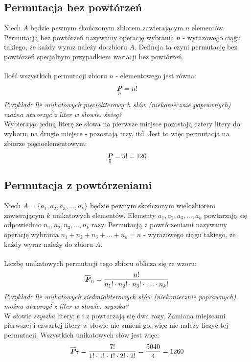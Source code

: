 \documentclass[14pt,a4paper]{extarticle}
\DeclareMathOperator{\varperm}{\textbf{\textit{P}}}
\begin{document}
\newpage
\subsection*{Permutacja bez powtórzeń}
\noindent Niech $A$ będzie pewnym skończonym zbiorem zawierającym $n$ elementów.
Permutacją bez powtórzeń nazywamy operację wybrania $n$ - wyrazowego ciągu takiego,
że każdy wyraz należy do zbioru $A$. Defincja ta czyni permutację bez powtórzeń specjalnym
przypadkiem wariacji bez powtórzeń.\\\\
Ilość wszystkich permutacji zbioru $n$ - elementowego jest równa:
\[\varperm_{n} = n!\]
\noindent\textit{Przykład: Ile unikatowych pięcioliterowych słów (niekoniecznie poprawnych) można utworzyć z liter
w słowie: śnieg?}\\
Wybierając jedną literę ze słowa na pierwsze miejsce pozostają cztery litery do wyboru, na drugie miejsce - 
pozostają trzy, itd. Jest to więc permutacja na zbiorze pięcioelementowym:
\[\varperm_{5} = 5! = 120\]

\subsection*{Permutacja z powtórzeniami}
\noindent Niech $A = \{a_{1}, a_{2}, a_{3}, \ldots, a_{k}\}$ będzie pewnym skończonym wielozbiorem zawierającym $k$ unikatowych elementów.
Elementy $a_{1}, a_{2}, a_{3}, \ldots, a_{k}$ powtarzają się odpowiednio $n_{1}, n_{2}, n_{3}, \ldots, n_{k}$ razy. Permutacją 
z powtórzeniami nazywamy operację wybrania $n_{1} + n_{2} + n_{3} + \ldots + n_{k} = n$ - wyrazowego ciągu takiego,
że każdy wyraz należy do zbioru $A$.\\\\
Liczbę unikatowych permutacji tego zbioru oblicza się ze wzoru:
\[\overline{\varperm}_{n} = \dfrac{n!}{n_{1}!\cdot n_{2}!\cdot n_{3}!\cdot \ldots\cdot n_{k}!}\]
\noindent\textit{Przykład: Ile unikatowych siedmioliterowych słów (niekoniecznie poprawnych) można utworzyć z liter
w słowie: szyszka?}\\
W słowie \textit{szyszka} litery: s i z powtarzają się dwa razy. Zamiana miejscami pierwszej i czwartej
litery w słowie nie zmieni go, więc nie należy liczyć tej permutacji. Wszystkich unikatowych słów jest
więc:
\[\overline{\varperm}_{7} = \dfrac{7!}{1!\cdot 1!\cdot 1!\cdot 2!\cdot 2!} = \dfrac{5040}{4} = 1260\]

\newpage
\end{document}
